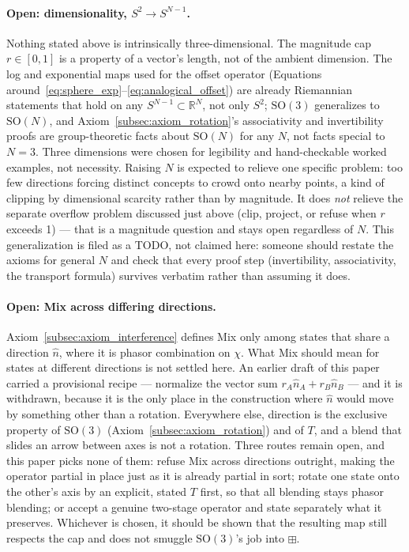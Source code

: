 \documentclass[12pt, a4paper]{article}
\begin{document}
\paragraph{Open: dimensionality, $S^2 \to S^{N-1}$.} Nothing stated
above is intrinsically three-dimensional. The magnitude cap
$r\in[0,1]$ is a property of a vector's length, not of the ambient
dimension. The log and exponential maps used for the offset operator
(Equations around~\eqref{eq:sphere_exp}--\eqref{eq:analogical_offset})
are already Riemannian statements that hold on any $S^{N-1}\subset
\mathbb{R}^N$, not only $S^2$; $\mathrm{SO}(3)$ generalizes to
$\mathrm{SO}(N)$, and Axiom~\ref{subsec:axiom_rotation}'s
associativity and invertibility proofs are group-theoretic facts
about $\mathrm{SO}(N)$ for any $N$, not facts special to $N=3$. Three
dimensions were chosen for legibility and hand-checkable worked
examples, not necessity. Raising $N$ is expected to relieve one
specific problem: too few directions forcing distinct concepts to
crowd onto nearby points, a kind of clipping by dimensional scarcity
rather than by magnitude. It does \emph{not} relieve the separate
overflow problem discussed just above (clip, project, or refuse when
$r$ exceeds 1) --- that is a magnitude question and stays open
regardless of $N$. This generalization is filed as a TODO, not
claimed here: someone should restate the axioms for general $N$ and
check that every proof step (invertibility, associativity, the
transport formula) survives verbatim rather than assuming it does.

\paragraph{Open: Mix across differing directions.}
\label{subsec:mix_scattered_open}
Axiom~\ref{subsec:axiom_interference} defines Mix only among states
that share a direction $\hat n$, where it is phasor combination on
$\chi$. What Mix should mean for states at different directions is not
settled here. An earlier draft of this paper carried a provisional
recipe --- normalize the vector sum $r_A\hat n_A+r_B\hat n_B$ --- and
it is withdrawn, because it is the only place in the construction
where $\hat n$ would move by something other than a rotation.
Everywhere else, direction is the exclusive property of
$\mathrm{SO}(3)$ (Axiom~\ref{subsec:axiom_rotation}) and of $T$, and a
blend that slides an arrow between axes is not a rotation. Three
routes remain open, and this paper picks none of them: refuse Mix
across directions outright, making the operator partial in place just
as it is already partial in sort; rotate one state onto the other's
axis by an explicit, stated $T$ first, so that all blending stays
phasor blending; or accept a genuine two-stage operator and state
separately what it preserves. Whichever is chosen, it should be shown
that the resulting map still respects the cap and does not smuggle
$\mathrm{SO}(3)$'s job into $\boxplus$.
\end{document}
